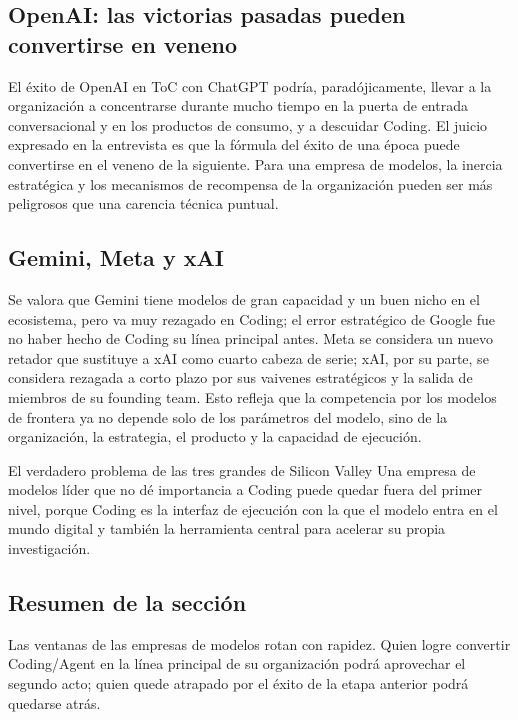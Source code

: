 \subsection{OpenAI: las victorias pasadas pueden convertirse en veneno}

El éxito de OpenAI en ToC con ChatGPT podría, paradójicamente, llevar a la organización a concentrarse durante mucho tiempo en la puerta de entrada conversacional y en los productos de consumo, y a descuidar Coding. El juicio expresado en la entrevista es que la fórmula del éxito de una época puede convertirse en el veneno de la siguiente. Para una empresa de modelos, la inercia estratégica y los mecanismos de recompensa de la organización pueden ser más peligrosos que una carencia técnica puntual.

\subsection{Gemini, Meta y xAI}

Se valora que Gemini tiene modelos de gran capacidad y un buen nicho en el ecosistema, pero va muy rezagado en Coding; el error estratégico de Google fue no haber hecho de Coding su línea principal antes. Meta se considera un nuevo retador que sustituye a xAI como cuarto cabeza de serie; xAI, por su parte, se considera rezagada a corto plazo por sus vaivenes estratégicos y la salida de miembros de su founding team. Esto refleja que la competencia por los modelos de frontera ya no depende solo de los parámetros del modelo, sino de la organización, la estrategia, el producto y la capacidad de ejecución.

\begin{importantbox}{El verdadero problema de las tres grandes de Silicon Valley}
Una empresa de modelos líder que no dé importancia a Coding puede quedar fuera del primer nivel, porque Coding es la interfaz de ejecución con la que el modelo entra en el mundo digital y también la herramienta central para acelerar su propia investigación.
\end{importantbox}

\subsection{Resumen de la sección}

Las ventanas de las empresas de modelos rotan con rapidez. Quien logre convertir Coding/Agent en la línea principal de su organización podrá aprovechar el segundo acto; quien quede atrapado por el éxito de la etapa anterior podrá quedarse atrás.
